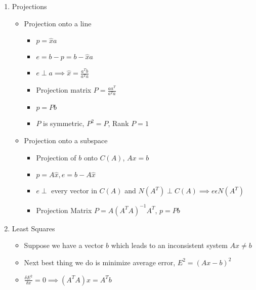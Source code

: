 \documentclass[a4paper]{article}
\begin{document}
\begin{enumerate}
\begin{itemize}
		\end{itemize}
		\item Projections
		\begin{itemize}
			\item Projection onto a line
			\begin{itemize}
				\item $p = \hat{x}a$
				\item $e = b - p = b - \hat{x}a$
				\item $e \perp a \implies \hat{x} = \frac{a^{T}b}{a^{T}a}$
				\item Projection matrix $P = \frac{aa^{T}}{a^{T}a}$
				\item $p = Pb$
				\item $P$ is symmetric, $P^{2} = P$, Rank $P = 1$
			\end{itemize}
			\item Projection onto a subspace
			\begin{itemize}
				\item Projection of $b$ onto $C(A)$, $Ax = b$
				\item $p = A\hat{x}, e = b - A\hat{x}$
				\item $e \perp$ every vector in $C(A)$ and $N(A^{T}) \perp C(A) \implies e\epsilon N(A^{T})$
				\item Projection Matrix $P = A(A^{T}A)^{-1}A^{T}$, $p = Pb$
			\end{itemize}
		\end{itemize}
		\item Least Squares
		\begin{itemize}
			\item Suppose we have a vector $b$ which leads to an inconsistent system $Ax\neq b$
			\item Next best thing we do is minimize average error, $E^{2} = (Ax-b)^{2}$
			\item $\frac{\delta E^{2}}{\delta x} = 0 \implies (A^{T}A)x = A^{T}b$ 
		\end{itemize}
	\end{enumerate}
\end{document}
